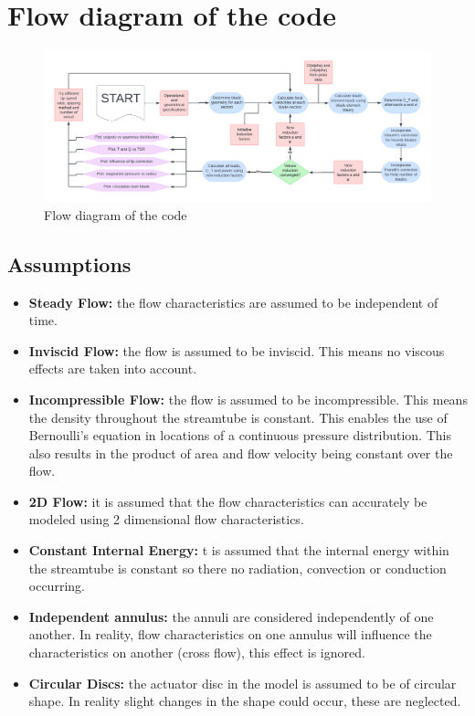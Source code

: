 \chapter{Flow diagram of the code}

\begin{figure}[H]
    \centering
    \includegraphics[width=\textwidth]{Figures/Blank diagram.pdf}
    \caption{Flow diagram of the code}
    \label{fig:enter-label}
\end{figure}

\section{Assumptions}
\begin{itemize}
    \item \textbf{Steady Flow:} the flow characteristics are assumed to be independent of time.
    \item \textbf{Inviscid Flow:} the flow is assumed to be inviscid. This means no viscous effects are taken into account.
    \item \textbf{Incompressible Flow:} the flow is assumed to be incompressible. This means the density throughout the streamtube is constant. This enables the use of Bernoulli's equation in locations of a continuous pressure distribution. This also results in the product of area and flow velocity being constant over the flow.
    \item \textbf{2D Flow:} it is assumed that the flow characteristics can accurately be modeled using 2 dimensional flow characteristics.
    \item \textbf{Constant Internal Energy:}  t is assumed that the internal energy within the streamtube is constant so there no radiation, convection or conduction occurring.
    \item \textbf{Independent annulus:} the annuli are considered independently of one another. In reality, flow characteristics on one annulus will influence the characteristics on another (cross flow), this effect is ignored.
    \item \textbf{Circular Discs:} the actuator disc in the model is assumed to be of circular shape. In reality slight changes in the shape could occur, these are neglected.
\end{itemize}